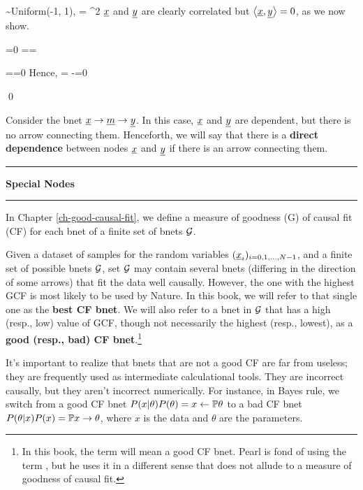 \beq
\rvx \sim Uniform(-1, 1), \quad \rvy = \rvx^2
\eeq
$\rvx$ and $\rvy$ are clearly correlated but
$\av{\rvx, \rvy}=0$, as we now show.

\beq
\av{\rvx}=0
\eeq
\beq
\av{\rvy}==
\eeq

\beq
\av{\rvx \rvy}==0
\eeq
Hence,
\beq
\av{\rvx, \rvy}=
\av{\rvx \rvy}-\av{\rvx}\av{\rvy}=0
\eeq

\qed



Consider the bnet $\rvx\rarrow\rvm\rarrow\rvy$.
In this case,
$\rvx$ and $\rvy$ are dependent,
but there is no arrow 
connecting them.
Henceforth,
we will say that there is a
  {\bf direct dependence }
between nodes $\rvx$ and
$\rvy$ if there is an arrow
connecting them.
 
\hrule
{\bf Special Nodes}
 
\hiddenNodes

\selectionGraphs



\hrule
In  Chapter \ref{ch-good-causal-fit},
we define a measure
of goodness (G) of causal fit (CF)
for each bnet of a finite set of bnets ${\cal G}$.

Given a dataset of samples for
the random variables
$(\rvx_i)_{i=0, 1, \ldots, N-1}$,
and a finite set of possible bnets ${\cal G}$,
set ${\cal G}$ may contain
several bnets (differing
in the direction
of some arrows) that
fit the data well causally. However,
the one with the highest
GCF is most likely to be used
by Nature.
In this book, we will refer to that
single one as the
{\bf best CF bnet}.
We will also refer to
a bnet in ${\cal G}$ that has a high (resp., low) value
of GCF, though not
necessarily the highest (resp., lowest),
as a {\bf good (resp., bad) CF bnet}.\footnote{
In  this book, the term 
will mean a good CF bnet. Pearl is fond
of using the term ,
but he uses it in a different
sense that does not
allude to a measure of goodness of causal fit.}

It's important to realize
that bnets that are not a good CF
are far from useless; they
are frequently used
as intermediate calculational
tools. They are incorrect causally,
but they aren't incorrect numerically.
For instance, in Bayes rule,
we switch from a good CF bnet
$P(x|\theta)P(\theta)=x\leftarrow{ \mathbb{P}} \theta$
to a bad CF bnet
$P(\theta|x)P(x)={ \mathbb{P}} x\rightarrow\theta$,
where $x$ is the data
and $\theta$ are the parameters.
